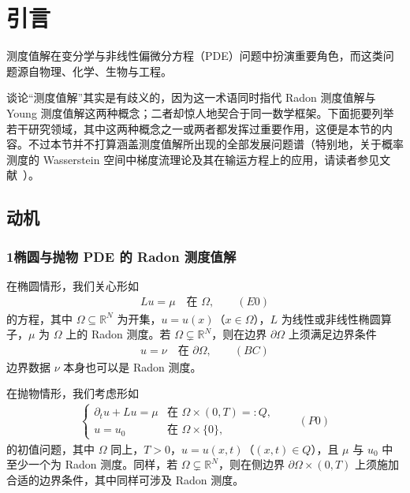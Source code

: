 \documentclass[../main.tex]{subfiles}
\begin{document}
\chapter*{引言}\label{chapter:introduction}

测度值解在变分学与非线性偏微分方程（PDE）问题中扮演重要角色，而这类问题源自物理、化学、生物与工程。

谈论“测度值解”其实是有歧义的，因为这一术语同时指代 Radon 测度值解与 Young 测度值解这两种概念；二者却惊人地契合于同一数学框架。下面扼要列举若干研究领域，其中这两种概念之一或两者都发挥过重要作用，这便是本节的内容。不过本节并不打算涵盖测度值解所出现的全部发展问题谱（特别地，关于概率测度的 Wasserstein 空间中梯度流理论及其在输运方程上的应用，请读者参见文献~\cite{ref06}）。

\section*{动机}\label{section:intro-motivation}

\subsection*{1\quad 椭圆与抛物 PDE 的 Radon 测度值解}\label{subsection:intro-radon}

在椭圆情形，我们关心形如
\begin{align*}
Lu = \mu \quad \text{在 }\Omega, \qquad(E0)
\end{align*}
的方程，其中 $\Omega\subseteq\mathbb{R}^N$ 为开集，$u=u(x)$（$x\in\Omega$），$L$ 为线性或非线性椭圆算子，$\mu$ 为 $\Omega$ 上的 Radon 测度。若 $\Omega\subsetneq\mathbb{R}^N$，则在边界 $\partial\Omega$ 上须满足边界条件
\begin{align*}
u=\nu \quad \text{在 }\partial\Omega, \qquad(BC)
\end{align*}
边界数据 $\nu$ 本身也可以是 Radon 测度。

在抛物情形，我们考虑形如
\begin{align*}
\begin{cases}
\partial_t u + Lu = \mu & \text{在 }\Omega\times(0,T)=:Q,\\
u=u_0 & \text{在 }\Omega\times\{0\},
\end{cases}
\qquad(P0)
\end{align*}
的初值问题，其中 $\Omega$ 同上，$T>0$，$u=u(x,t)$（$(x,t)\in Q$），且 $\mu$ 与 $u_0$ 中至少一个为 Radon 测度。同样，若 $\Omega\subsetneq\mathbb{R}^N$，则在侧边界 $\partial\Omega\times(0,T)$ 上须施加合适的边界条件，其中同样可涉及 Radon 测度。
\end{document}
